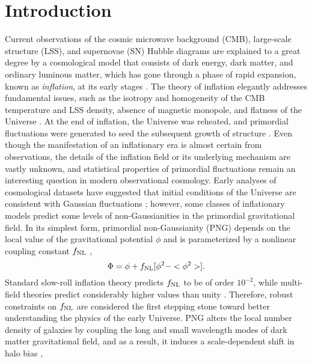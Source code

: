 \section{Introduction}
\label{sec:introduction}
Current observations of the cosmic microwave background (CMB), large-scale structure (LSS), and supernovae (SN) Hubble diagrams are explained to a great degree by a cosmological model that consists of dark energy, dark matter, and ordinary luminous matter, which has gone through a phase of rapid expansion, known as \textit{inflation}, at its early stages \citep[see, e.g.,][]{weinberg2013observational}. The theory of inflation elegantly addresses fundamental issues, such as the isotropy and homogeneity of the CMB temperature and LSS density, absence of magnetic monopole, and flatness of the Universe \citep[see, e.g.,][]{weinberg2008cosmology}. At the end of inflation, the Universe was reheated, and primordial fluctuations were generated to seed the subsequent growth of structure \citep{kofman1994reheating, bassett2006inflation, lyth2009primordial}. Even though the manifestation of an inflationary era is almost certain from observations, the details of the inflation field or its underlying mechanism are vastly unknown, and statistical properties of primordial fluctuations remain an interesting question in modern observational cosmology. Early analyses of cosmological datasets have suggested that initial conditions of the Universe are consistent with Gaussian fluctuations \citep{guth2005inflationary}; however, some classes of inflationary models predict some levels of non-Gaussianities in the primordial gravitational field. In its simplest form, primordial non-Gaussianity (PNG) depends on the local value of the gravitational potential $\phi$ and is parameterized by a nonlinear coupling constant $f_{\rm NL}$ \citep{komatsu2001acoustic},
\begin{equation}
 \Phi = \phi + f_{\rm NL} [\phi^{2} - <\phi^{2}>].
\end{equation}
Standard slow-roll inflation theory predicts $f_{\rm NL}$ to be of order $10^{-2}$, while multi-field theories predict considerably higher values than unity \citep[see, e.g.,][]{de2017next}. Therefore, robust constraints on $f_{\rm NL}$ are considered the first stepping stone toward better understanding the physics of the early Universe. PNG alters the local number density of galaxies by coupling the long and small wavelength modes of dark matter gravitational field, and as a result, it induces a scale-dependent shift in halo bias \citep[see, e.g.,][]{dalal2008imprints, slosar2008constraints},
